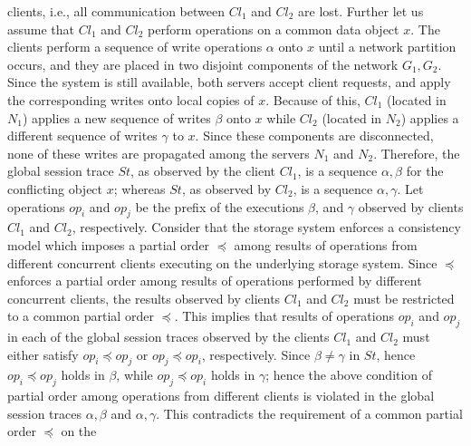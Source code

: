 \documentclass{sig-alternate-05-2015}
\begin{document}
clients, i.e., all communication between $\mathit{Cl}_1$  and  $\mathit{Cl}_2$ are lost. Further let us assume
 that $\mathit{Cl}_1$  and  $\mathit{Cl}_2$ perform operations on a common data object $x$.
 The clients perform a sequence of write operations $\alpha$  onto $x$ until a network partition occurs, and they are
 placed in two disjoint components of the  network ${G_1, G_2}$. Since the system is still available, both servers accept
 client requests, and apply the corresponding writes onto local copies of $x$. Because of this, $\mathit{Cl}_1$ (located
 in $N_1$) applies a new sequence of writes $\beta$ onto $x$ while $\mathit{Cl}_2$ (located in $N_2$) applies a different sequence of writes $\gamma$
to $x$. Since
these components are disconnected, none of these writes are propagated among the servers $N_1$ and $N_2$.
 Therefore, the global session trace $\mathit{St}$, as observed by  the client $\mathit{Cl}_1$, is a sequence $\alpha, \beta$
 for the conflicting object $x$; whereas  $\mathit{St}$, as observed by $\mathit{Cl}_2$,  is a sequence $\alpha, \gamma$.  Let operations $\mathit{op}_i$ and $\mathit{op}_j$  be the prefix of the executions  $\beta$, and $\gamma$ observed by clients $\mathit{Cl}_1$ and $\mathit{Cl}_2$, respectively. 
 Consider that the storage system enforces a consistency model which imposes a partial order $\preccurlyeq$ among results of operations from different concurrent clients executing on the underlying storage system. %
Since $\preccurlyeq$  enforces a partial order among results of operations performed by  different concurrent clients, the results observed by clients  $\mathit{Cl}_1$ and $\mathit{Cl}_2$ must be restricted to a common partial order $\preccurlyeq$. This implies  that results of operations $\mathit{op}_i$ and $\mathit{op}_j$ in each of the global session traces observed by  the clients  $\mathit{Cl}_1$ and $\mathit{Cl}_2$ must either satisfy $\mathit{op}_i \preccurlyeq \mathit{op}_j$ or $\mathit{op}_j \preccurlyeq \mathit{op}_i$, respectively. %
  Since $\beta \not= \gamma$ in $\mathit{St}$, hence $\mathit{op}_i \preccurlyeq \mathit{op}_j$ holds in $\beta$, while $\mathit{op}_j \preccurlyeq \mathit{op}_i$ holds in $\gamma$; hence the above condition of partial order among operations from different clients is violated in the global session traces $\alpha, \beta$ and  $\alpha, \gamma$.  This contradicts the requirement of a common partial order $\preccurlyeq$ on the
\end{document}
